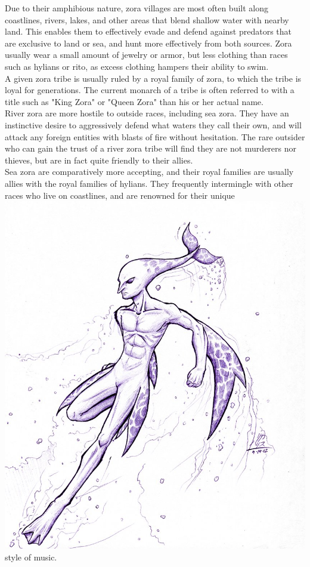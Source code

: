 \documentclass[10pt,twoside,twocolumn,openany]{book}
\begin{document}
Due to their amphibious nature, zora villages are most often built along coastlines, rivers, lakes, and other areas that blend shallow water with nearby land. This enables them to effectively evade and defend against predators that are exclusive to land or sea, and hunt more effectively from both sources. Zora usually wear a small amount of jewelry or armor, but less clothing than races such as hylians or rito, as excess clothing hampers their ability to swim.\\
A given zora tribe is usually ruled by a royal family of zora, to which the tribe is loyal for generations. The current monarch of a tribe is often referred to with a title such as "King Zora" or "Queen Zora" than his or her actual name.\\
River zora are more hostile to outside races, including sea zora. They have an instinctive desire to aggressively defend what waters they call their own, and will attack any foreign entities with blasts of fire without hesitation. The rare outsider who can gain the trust of a river zora tribe will find they are not murderers nor thieves, but are in fact quite friendly to their allies.\\
Sea zora are comparatively more accepting, and their royal families are usually allies with the royal families of hylians. They frequently intermingle with other races who live on coastlines, and are renowned for their unique \\
\includegraphics{zora.png} \\
style of music.
\end{document}
